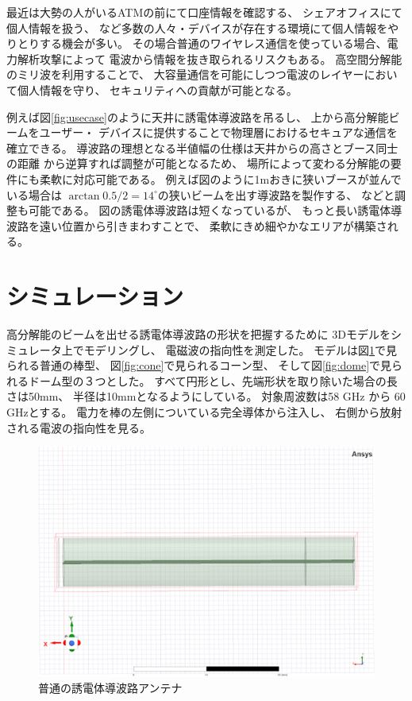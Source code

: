 \documentclass[technicalreport]{ieicej}
\begin{document}
最近は大勢の人がいるATMの前にて口座情報を確認する、
シェアオフィスにて個人情報を扱う、
など多数の人々・デバイスが存在する環境にて個人情報をやりとりする機会が多い。
その場合普通のワイヤレス通信を使っている場合、電力解析攻撃によって
電波から情報を抜き取られるリスクもある。
高空間分解能のミリ波を利用することで、
大容量通信を可能にしつつ電波のレイヤーにおいて個人情報を守り、
セキュリティへの貢献が可能となる。

例えば図\ref{fig:usecase}のように天井に誘電体導波路を吊るし、
上から高分解能ビームをユーザー・
デバイスに提供することで物理層におけるセキュアな通信を確立できる。
導波路の理想となる半値幅の仕様は天井からの高さとブース同士の距離
から逆算すれば調整が可能となるため、
場所によって変わる分解能の要件にも柔軟に対応可能である。
例えば図のように1mおきに狭いブースが並んでいる場合は
$\arctan 0.5 / 2 = 14^{\circ}$の狭いビームを出す導波路を製作する、
などと調整も可能である。
図の誘電体導波路は短くなっているが、
もっと長い誘電体導波路を遠い位置から引きまわすことで、
柔軟にきめ細やかなエリアが構築される。


\section{シミュレーション}

高分解能のビームを出せる誘電体導波路の形状を把握するために
3Dモデルをシミュレータ上でモデリングし、
電磁波の指向性を測定した。
モデルは図\ref{fig:normal}で見られる普通の棒型、
図\ref{fig:cone}で見られるコーン型、
そして図\ref{fig:dome}で見られるドーム型の３つとした。
すべて円形とし、先端形状を取り除いた場合の長さは50mm、
半径は10mmとなるようにしている。
対象周波数は58 GHz から 60 GHzとする。
電力を棒の左側についている完全導体から注入し、
右側から放射される電波の指向性を見る。

\begin{figure}[tb]
  \begin{center}
    \includegraphics[bb=0 0 384 262, width=0.7\linewidth]{img/normal.pdf}
    \caption{普通の誘電体導波路アンテナ}
    \label{fig:normal}
  \end{center}
\end{figure}
\end{document}
